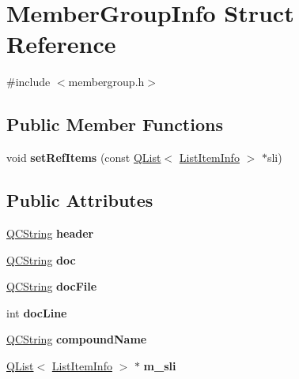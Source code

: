 \hypertarget{struct_member_group_info}{}\section{Member\+Group\+Info Struct Reference}
\label{struct_member_group_info}


{\ttfamily \#include $<$membergroup.\+h$>$}

\subsection*{Public Member Functions}
\begin{DoxyCompactItemize}
\item 
\mbox{\label{struct_member_group_info_a4e4a2794cd25b882ccacbcb4a7a127db}} 
void {\bfseries set\+Ref\+Items} (const \mbox{\hyperlink{class_q_list}{Q\+List}}$<$ \mbox{\hyperlink{struct_list_item_info}{List\+Item\+Info}} $>$ $\ast$sli)
\end{DoxyCompactItemize}
\subsection*{Public Attributes}
\begin{DoxyCompactItemize}
\item 
\mbox{\label{struct_member_group_info_ae9064c66b617952b9c0f924ef30ce226}} 
\mbox{\hyperlink{class_q_c_string}{Q\+C\+String}} {\bfseries header}
\item 
\mbox{\label{struct_member_group_info_a263221a15d1c749d14edc584881a27b3}} 
\mbox{\hyperlink{class_q_c_string}{Q\+C\+String}} {\bfseries doc}
\item 
\mbox{\label{struct_member_group_info_ac6b12091c7246d55a69990307d9038e9}} 
\mbox{\hyperlink{class_q_c_string}{Q\+C\+String}} {\bfseries doc\+File}
\item 
\mbox{\label{struct_member_group_info_a4a1cd4db8cbd13c0447d7c62fa7f1954}} 
int {\bfseries doc\+Line}
\item 
\mbox{\label{struct_member_group_info_a652f192bb091e84a9f5405ec5e20f49b}} 
\mbox{\hyperlink{class_q_c_string}{Q\+C\+String}} {\bfseries compound\+Name}
\item 
\mbox{\label{struct_member_group_info_ab8d0845ef9ecaa1d3d09374098316fca}} 
\mbox{\hyperlink{class_q_list}{Q\+List}}$<$ \mbox{\hyperlink{struct_list_item_info}{List\+Item\+Info}} $>$ $\ast$ {\bfseries m\+\_\+sli}
\end{DoxyCompactItemize}


